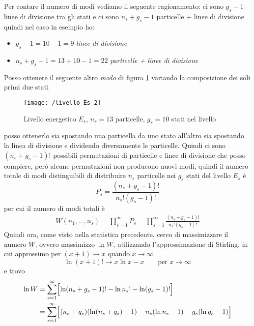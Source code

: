 Per contare il numero di modi vediamo il seguente ragionamento:
ci sono $g_s - 1$ linee di divisione tra gli stati
e ci sono $n_s + g_s - 1$ particelle + linee di divisione 
quindi nel caso in esempio ho:
\begin{itemize}
\item $g_s - 1 = 10 - 1 = 9 $ \textit{linee di divisione}
\item $n_s + g_s - 1 = 13 + 10 - 1 = 22$ \textit{particelle + linee di divisione}
\end{itemize}
Posso ottenere il seguente altro \textit{modo} di figura \ref{livello_Es_2} variando la composizione dei soli primi due stati 
\begin{figure}[h]
\centering
\texttt{[image: /livello\_Es\_2]}
\caption{Livello energetico $E_s$, $n_s = 13$ particelle, $g_s = 10$ stati nel livello}
\label{livello_Es_2}
\end{figure}
posso ottenerlo sia spostando una particella da uno stato all'altro sia spostando la linea di divisione e dividendo diversamente le particelle.
Quindi ci sono $(n_s + g_s - 1)!$ possibili permutazioni di particelle e linee di divisione che posso compiere, però alcune permutazioni non producono nuovi modi, quindi il numero totale di modi distinguibili di distribuire $n_s$ particelle nei $g_s$ stati del livello $E_s$ è
\begin{equation}
P_s = \frac{ (n_s + g_s - 1)!}{n_s! (g_s - 1)! }
\end{equation}
per cui il numero di modi totali è
\begin{equation}
\begin{split}
W(n_1, ..., n_s) = \prod_{s=1}^{ \infty } P_s = \prod_{s=1}^{ \infty } \frac{ (n_s + g_s - 1)!}{n_s! (g_s - 1)! }
\end{split}
\end{equation}
Quindi ora, come visto nella statistica precedente, cerco di massimizzare il numero $W$, ovvero massimizzo $\ln W$, utilizzando l'approssimazione di Stirling, in cui approssimo per $(x+1) \to x$ quando $x \to \infty$
\begin{equation}
\ln (x+1)! \to x \ln x - x \quad\quad \mbox{per } x \to \infty
\label{stirling_2}
\end{equation}
e trovo
\begin{equation}
\begin{split}
\ln W & = \sum_{s=1}^{\infty} \Bigl[ \ln ( n_s + g_s - 1 )! - \ln n_s ! - \ln (g_s - 1)! \Bigr] \\
& = \sum_{s=1}^{\infty} \Bigl[ ( n_s + g_s )(\ln ( n_s + g_s ) - 1) - n_s (\ln n_s -1 ) - g_s (\ln g_s - 1) \Bigr]
\end{split}
\end{equation}
